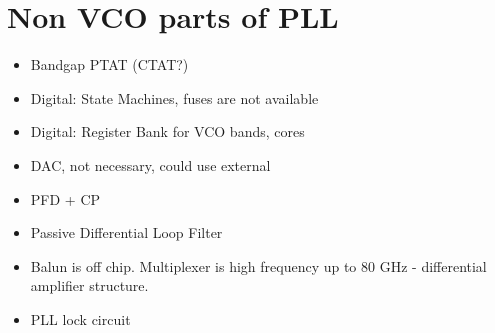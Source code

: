 \documentclass{article}
\begin{document}







\newpage




\section{Non VCO parts of PLL}


\begin{itemize}
	\item Bandgap PTAT (CTAT?)  %
	\item Digital: State Machines, fuses are not available
	\item Digital: Register Bank for VCO bands, cores
	\item DAC, not necessary, could use external
	\item PFD + CP
	\item Passive Differential Loop Filter
	\item Balun is off chip. Multiplexer is high frequency up to 80 GHz - differential amplifier structure.
	\item PLL lock circuit
\end{itemize}
\end{document}
